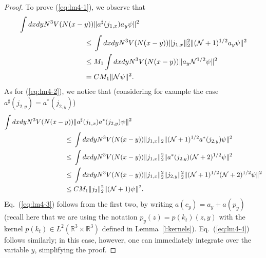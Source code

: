 \documentclass[11pt,a4paper]{article}
\newcommand{\bR}{{\mathbb R}}
\newcommand{\cN}{{\cal N}}
\begin{document}
\begin{proof}
To prove (\ref{eq:lm4-1}), we observe that
\[ \begin{split} \int dx dy N^3 V (N (x-y)) & \| a^\sharp (j_{1,x}) a_y \psi \|^2 \\ \leq \; & \int dx dy N^3 V (N (x-y)) \| j_{1,x} \|_2^2 \| (\cN+1)^{1/2} a_y \psi \|^2 \\ \leq \; & M_1 \int dx dy N^3 V (N (x-y)) \| a_y \cN^{1/2} \psi \|^2 \\ = \; &C M_1 \| \cN \psi \|^2. \end{split} \]
As for (\ref{eq:lm4-2}), we notice that (considering for example the case $a^\sharp (j_{2,y}) = a^* (j_{2,y})$) 
\[ \begin{split} 
\int dx dy N^3 V(N (x-y)) & \| a^\sharp (j_{1,x}) a^* (j_{2,y}) \psi \|^2 \\ \leq \; & \int dx dy N^3 V (N (x-y)) \| j_{1,x} \|_2 \| (\cN+1)^{1/2} a^* (j_{2,y}) \psi \|^2 \\ \leq \; & \int dx dy N^3 V (N (x-y)) \| j_{1,x} \|^2_2 \| a^* (j_{2,y}) (\cN+2)^{1/2} \psi \|^2  \\ \leq \; & \int dx dy N^3 V (N (x-y)) \| j_{1,x} \|^2_2  \| j_{2,y} \|_2^2 \| (\cN+1)^{1/2} (\cN+2)^{1/2} \psi \|^2 \\ \leq \; & C M_1 \| j_2 \|^2_{2} \| (\cN+1) \psi \|^2.  \end{split} \]
Eq.\ (\ref{eq:lm4-3}) follows from the first two, by writing $a (c_y) = a_y + a (p_y)$ (recall here that we are using the notation $p_y (z) = p (k_t) (z,y)$ with the kernel $p (k_t) \in L^2 (\bR^3 \times \bR^3)$ defined in Lemma~\ref{l:kernels}). Eq.\ (\ref{eq:lm4-4}) follows similarly; in this case, however, one can immediately integrate over the variable $y$, simplifying the proof. 
\end{proof}
\end{document}
